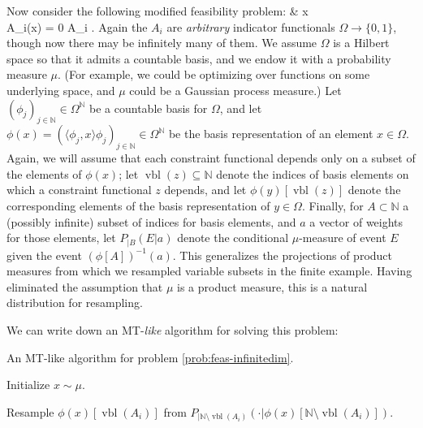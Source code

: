 \documentclass{article}
\def\seqn#1\eeqn{\begin{align}#1\end{align}}
\newcommand{\hasDist}%
  {\sim}
\newcommand{\inprod}[2]%
  {\langle #1, #2 \rangle}
\newcommand{\Nats}%
  {\mathbb{N}}
\begin{document}
\label{subsec:infinitedim}
Now consider the following modified feasibility problem:
\seqn
  \label{prob:feas-infinitedim}
   & x \in \Omega \\
  A_i(x) = 0 \forall A_i \in {} .
\eeqn
Again the $A_i$ are \emph{arbitrary} indicator functionals $\Omega \to \{0,1\}$, though now there may be infinitely many of them.
We assume $\Omega$ is a Hilbert space so that it admits a countable basis, and we endow it with a probability measure $\mu$.  (For example, we could be optimizing over functions on some underlying space, and $\mu$ could be a Gaussian process measure.)  Let $(\phi_j)_{j \in \Nats} \in \Omega^{\Nats}$ be a countable basis for $\Omega$, and let $\phi(x) = (\inprod{\phi_j}{x} \phi_j)_{j \in \Nats} \in \Omega^{\Nats}$ be the basis representation of an element $x \in \Omega$.  Again, we will assume that each constraint functional depends only on a subset of the elements of $\phi(x)$; let $\operatorname{vbl}(z) \subseteq \Nats$ denote the indices of basis elements on which a constraint functional $z$ depends, and let $\phi(y)[\operatorname{vbl}(z)]$ denote the corresponding elements of the basis representation of $y \in \Omega$.  Finally, for $A \subset \Nats$ a (possibly infinite) subset of indices for basis elements, and $a$ a vector of weights for those elements, let $P_{|B}(E | a)$ denote the conditional $\mu$-measure of event $E$ given the event $(\phi[A])^{-1}(a)$.  This generalizes the projections of product measures from which we resampled variable subsets in the finite example.  Having eliminated the assumption that $\mu$ is a product measure, this is a natural distribution for resampling.

We can write down an MT-\emph{like} algorithm for solving this problem:

\begin{algorithm}[H]
\caption{An MT-like algorithm for problem \ref{prob:feas-infinitedim}.}
\label{alg:mt-feas-infinitedim}
\begin{algorithmic}[1]

\State Initialize $x \hasDist \mu$.
\EndFor

    \Return
  \EndIf
  \State Resample $\phi(x)[\operatorname{vbl}(A_i)]$ from $P_{|\Nats \setminus \operatorname{vbl}(A_i)}(\cdot | \phi(x)[\Nats \setminus \operatorname{vbl}(A_i)])$.
  \EndFor
\EndFunction

\end{algorithmic}
\end{algorithm}
\end{document}
